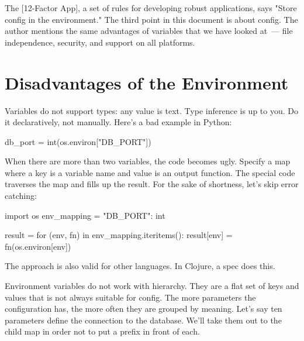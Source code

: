 

The [12-Factor App], a set of rules for developing robust applications, says "Store config in the environment." The third point in this document is about config. The author mentions the same advantages of variables that we have looked at~--- file independence, security, and support on all platforms.

\section{Disadvantages of the Environment}

\index{declarativity}

Variables do not support types: any value is text. Type inference is up to you. Do it declaratively, not manually. Here's a bad example in Python:


\begin{python}
db_port = int(os.environ["DB_PORT"])
\end{python}

When there are more than two variables, the code becomes ugly. Specify a map where a key is a variable name and value is an output function. The special code traverses the map and fills up the result. For the sake of shortness, let's skip error catching:

\begin{python}
import os
env_mapping = {"DB_PORT": int}

result = {}
for (env, fn) in env_mapping.iteritems():
    result[env] = fn(os.environ[env])
\end{python}

The approach is also valid for other languages. In Clojure, a spec does this.

Environment variables do not work with hierarchy. They are a flat set of keys and values that is not always suitable for config. The more parameters the configuration has, the more often they are grouped by meaning. Let's say ten parameters define the connection to the database. We'll take them out to the child map in order not to put a prefix in front of each.

